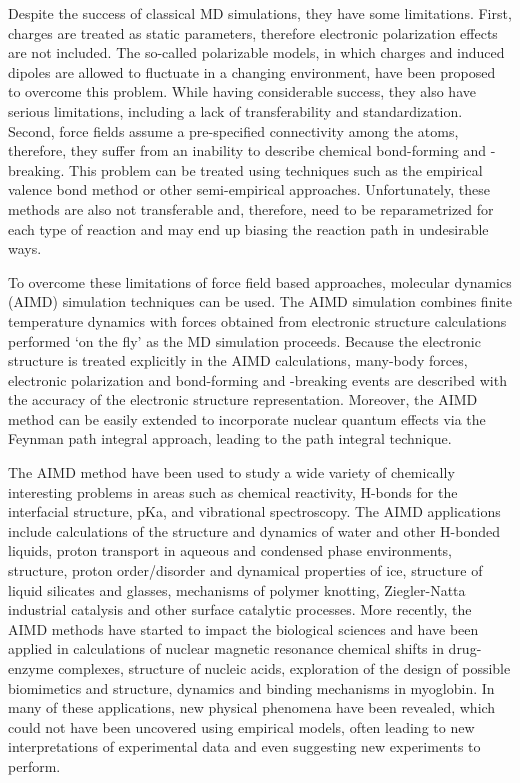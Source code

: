 Despite the success of classical MD simulations, they  have some limitations. First, charges
are treated as static parameters, therefore electronic polarization effects are
not included.  The so-called polarizable models\cite{Rick1994,Rick2002,Lamoureux2003}, in which charges 
and induced dipoles are allowed to fluctuate in a changing environment, 
have been proposed to overcome this problem. 
While having considerable success, they also have serious limitations, including a lack of transferability 
and standardization\cite{Tuckerman2002}. Second, force fields assume a pre-specified connectivity among the atoms, therefore, they suffer
from an inability to describe chemical bond-forming and -breaking. This problem
can be treated using techniques such as the empirical valence
bond method\cite{Warshel1980} or other semi-empirical approaches. Unfortunately, these methods are also not
transferable and, therefore, need to be reparametrized for each type of reaction and may end
up biasing the reaction path in undesirable ways.

To overcome these limitations of force field based approaches, \abinitio molecular dynamics (AIMD) simulation techniques\cite{DKR90,MCP92,Allen1993,MET96,MP97,DM00,RC02}
can be used. The AIMD simulation combines finite temperature dynamics with forces
obtained from electronic structure calculations performed ‘on the fly’ as the MD simulation
proceeds\cite{Marx2000}. Because the electronic structure is treated explicitly in the AIMD calculations,
many-body forces, electronic polarization and bond-forming and -breaking events are described
with the accuracy of the electronic structure representation. Moreover, the AIMD
method can be easily extended to incorporate nuclear quantum effects via the Feynman
path integral approach\cite{RPF65,RPF72}, leading to the \abinitio path integral technique\cite{Marx1996,Tuckerman1996,Marx1999}.

The AIMD method have been used to study a wide variety of chemically
interesting problems in areas such as chemical reactivity, H-bonds for the interfacial structure, pKa,
and vibrational spectroscopy. The AIMD applications include calculations of the structure and dynamics of water and other H-bonded liquids, 
proton transport in aqueous and condensed phase environments, structure, proton order/disorder and dynamical properties of ice, structure of
liquid silicates and glasses, mechanisms of polymer knotting, Ziegler-Natta industrial catalysis
and other surface catalytic processes. 
More recently, the AIMD methods have started to impact the
biological sciences and have been applied in calculations of nuclear magnetic resonance chemical shifts in 
drug-enzyme complexes, structure of nucleic acids, exploration of the design of possible
biomimetics and structure, dynamics and binding mechanisms in myoglobin.
In many of these applications, new physical phenomena have been revealed, which could
not have been uncovered using empirical models, often leading to new interpretations of
experimental data and even suggesting new experiments to perform\cite{Tuckerman2002}.


